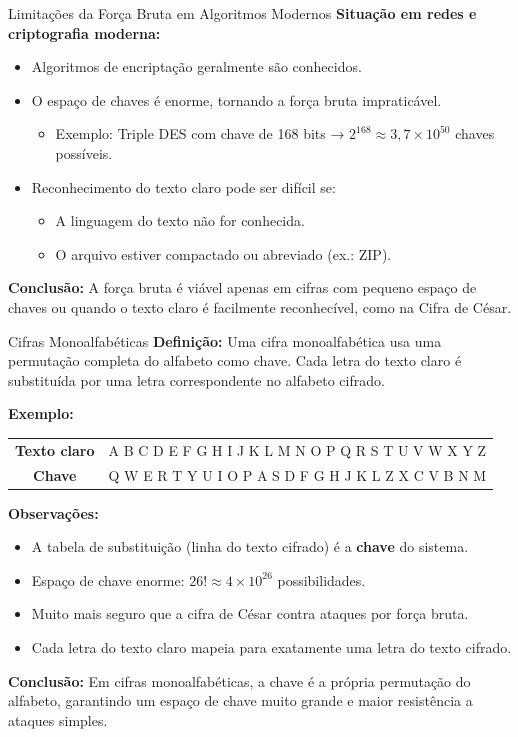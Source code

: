 \begin{frame}{Limitações da Força Bruta em Algoritmos Modernos}
\textbf{Situação em redes e criptografia moderna:}  
\begin{itemize}
    \item Algoritmos de encriptação geralmente são conhecidos.  
    \item O espaço de chaves é enorme, tornando a força bruta impraticável.  
        \begin{itemize}
            \item Exemplo: Triple DES com chave de 168 bits → \(2^{168} \approx 3,7 \times 10^{50}\) chaves possíveis.
        \end{itemize}
    \item Reconhecimento do texto claro pode ser difícil se:  
        \begin{itemize}
            \item A linguagem do texto não for conhecida.  
            \item O arquivo estiver compactado ou abreviado (ex.: ZIP).  
        \end{itemize}
\end{itemize}

\textbf{Conclusão:}  
A força bruta é viável apenas em cifras com pequeno espaço de chaves ou quando o texto claro é facilmente reconhecível, como na Cifra de César.
\end{frame}


\begin{frame}{Cifras Monoalfabéticas}
\textbf{Definição:}  
Uma cifra monoalfabética usa uma permutação completa do alfabeto como chave. Cada letra do texto claro é substituída por uma letra correspondente no alfabeto cifrado.

\medskip
\textbf{Exemplo:}  

\begin{tabular}{c|c}
\textbf{Texto claro} & A B C D E F G H I J K L M N O P Q R S T U V W X Y Z \\
\textbf{Chave} & Q W E R T Y U I O P A S D F G H J K L Z X C V B N M \\
\end{tabular}

\medskip
\textbf{Observações:}  
\begin{itemize}
    \item A tabela de substituição (linha do texto cifrado) é a \textbf{chave} do sistema.  
    \item Espaço de chave enorme: $26! \approx 4 \times 10^{26}$ possibilidades.  
    \item Muito mais seguro que a cifra de César contra ataques por força bruta.  
    \item Cada letra do texto claro mapeia para exatamente uma letra do texto cifrado.
\end{itemize}

\textbf{Conclusão:}  
Em cifras monoalfabéticas, a chave é a própria permutação do alfabeto, garantindo um espaço de chave muito grande e maior resistência a ataques simples.
\end{frame}

